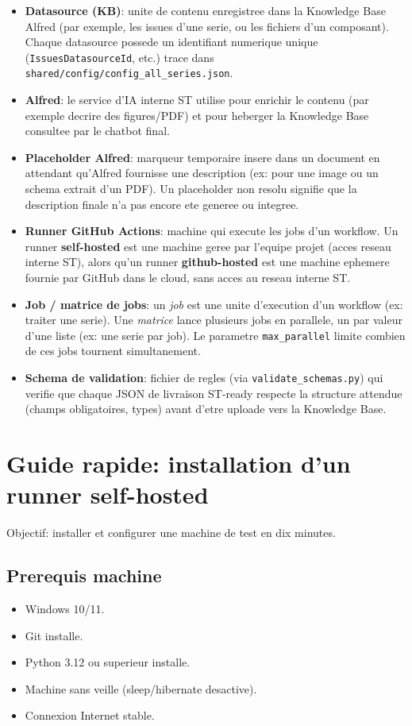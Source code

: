 \documentclass[11pt,a4paper]{article}
\begin{document}
\begin{itemize}[leftmargin=*]
  \item \textbf{Datasource (KB)}: unite de contenu enregistree dans la Knowledge
  Base Alfred (par exemple, les issues d'une serie, ou les fichiers d'un
  composant). Chaque datasource possede un identifiant numerique unique
  (\texttt{IssuesDatasourceId}, etc.) trace dans
  \texttt{shared/config/config\_all\_series.json}.
  \item \textbf{Alfred}: le service d'IA interne ST utilise pour enrichir le
  contenu (par exemple decrire des figures/PDF) et pour heberger la Knowledge
  Base consultee par le chatbot final.
  \item \textbf{Placeholder Alfred}: marqueur temporaire insere dans un document
  en attendant qu'Alfred fournisse une description (ex: pour une image ou un
  schema extrait d'un PDF). Un placeholder \og non resolu \fg{} signifie que la
  description finale n'a pas encore ete generee ou integree.
  \item \textbf{Runner GitHub Actions}: machine qui execute les jobs d'un
  workflow. Un runner \textbf{self-hosted} est une machine geree par l'equipe
  projet (acces reseau interne ST), alors qu'un runner \textbf{github-hosted}
  est une machine ephemere fournie par GitHub dans le cloud, sans acces au
  reseau interne ST.
  \item \textbf{Job / matrice de jobs}: un \emph{job} est une unite d'execution
  d'un workflow (ex: traiter une serie). Une \emph{matrice} lance plusieurs jobs
  en parallele, un par valeur d'une liste (ex: une serie par job). Le parametre
  \texttt{max\_parallel} limite combien de ces jobs tournent simultanement.
  \item \textbf{Schema de validation}: fichier de regles (via
  \texttt{validate\_schemas.py}) qui verifie que chaque JSON de livraison
  ST-ready respecte la structure attendue (champs obligatoires, types) avant
  d'etre uploade vers la Knowledge Base.
\end{itemize}

\section{Guide rapide: installation d'un runner self-hosted}
Objectif: installer et configurer une machine de test en dix minutes.

\subsection{Prerequis machine}
\begin{itemize}[leftmargin=*]
  \item Windows 10/11.
  \item Git installe.
  \item Python 3.12 ou superieur installe.
  \item Machine sans veille (sleep/hibernate desactive).
  \item Connexion Internet stable.
\end{itemize}
\end{document}
